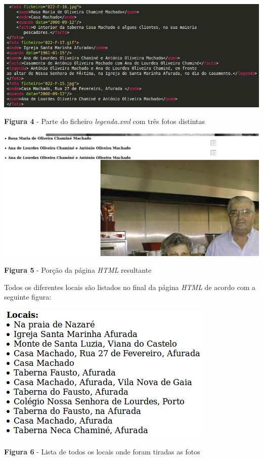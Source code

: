 \documentclass{article}
\begin{document}
\begin{center}
    \includegraphics[scale=0.7]{imagens/legenda}
    \caption{\textbf{Figura 4} - Parte do ficheiro \emph{legenda.xml} com três fotos distintas}
\end{center}

\begin{center}
    \includegraphics[scale=0.51]{imagens/foto}
    \caption{\textbf{Figura 5} - Porção da página \emph{HTML} resultante}
\end{center}

\newpage
Todos os diferentes locais são listados no final da página \emph{HTML} de acordo com a seguinte figura:

\begin{center}
    \includegraphics[scale=1]{imagens/locais}
    \newline\caption{\textbf{Figura 6} - Lista de todos os locais onde foram tiradas as fotos}
\end{center}
\end{document}
